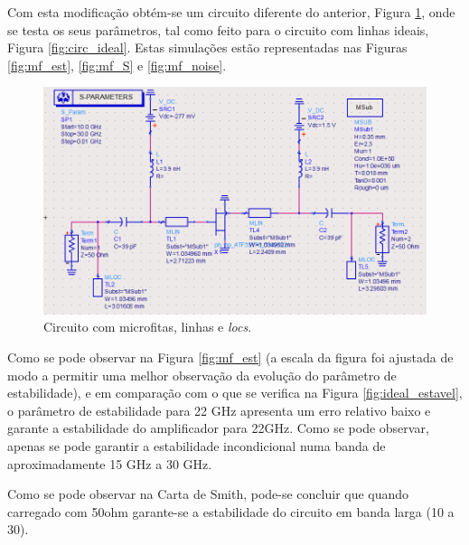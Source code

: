 \documentclass[11pt]{article}
\numberwithin{equation}{section}
\begin{document}
Com esta modificação obtém-se um circuito diferente do anterior, Figura \ref{fig:circuito_mf}, onde se testa os seus parâmetros, tal como feito para o circuito com linhas ideais, Figura \ref{fig:circ_ideal}. Estas simulações estão representadas nas Figuras \ref{fig:mf_est}, \ref{fig:mf_S} e \ref{fig:mf_noise}.

\begin{figure}[H]
	\centering
	\includegraphics[keepaspectratio=true, scale=0.41]{exps/Circuito_mf}
	\vspace{-0.5em}
	\caption{Circuito com microfitas, linhas e \textit{locs}.}
	\vspace{-0.8em}
	\label{fig:circuito_mf}
\end{figure}

Como se pode observar na Figura \ref{fig:mf_est} (a escala da figura foi ajustada de modo a permitir uma melhor observação da evolução do parâmetro de estabilidade), e em comparação com o que se verifica na Figura \ref{fig:ideal_estavel}, o parâmetro de estabilidade para 22 GHz apresenta um erro relativo baixo e garante a estabilidade do amplificador para 22GHz. Como se pode observar, apenas se pode garantir a estabilidade incondicional numa banda de aproximadamente 15 GHz a 30 GHz.

Como se pode observar na Carta de Smith, pode-se concluir que quando carregado com 50ohm garante-se a estabilidade do circuito em banda larga (10 a 30).

\end{document}
